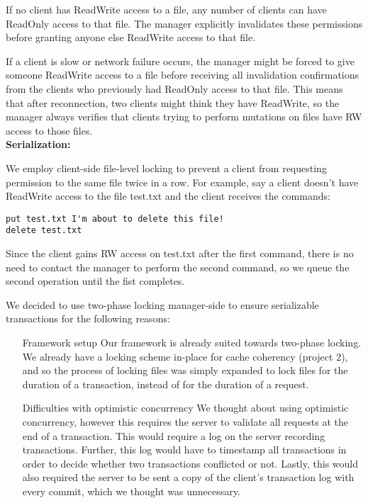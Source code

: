 \documentclass[11pt]{article}
\begin{document}
If no client has ReadWrite access to a file, any number of clients can have ReadOnly access to that file.
The manager explicitly invalidates these permissions before granting anyone else ReadWrite access to that file.

If a client is slow or network failure occurs, the manager might be forced to give someone ReadWrite access to a file before receiving all invalidation confirmations from the clients who previously had ReadOnly access to that file. This means that after reconnection, two clients might think they have ReadWrite, so the manager always verifies that clients trying to perform mutations on files have RW access to those files. \\

\textbf{Serialization:}

We employ client-side file-level locking to prevent a client from requesting permission to the same file twice in a row.
For example, say a client doesn't have ReadWrite access to the file test.txt and the client receives the commands:

\begin{verbatim}
put test.txt I'm about to delete this file!
delete test.txt
\end{verbatim}

Since the client gains RW access on test.txt after the first command, there is no need to contact the manager to perform the second command, so we queue the second operation until the fist completes.

We decided to use two-phase locking manager-side to ensure serializable transactions for the following reasons:

\begin{enumerate}
\item[Framework setup] Our framework is already suited towards two-phase locking. We already have a locking scheme in-place for cache coherency (project 2), and so the process of locking files was 
simply expanded to lock files for the duration of a transaction, instead of for the duration of a request.
\item[Difficulties with optimistic concurrency] We thought about using optimistic concurrency, however this requires the server to validate all requests at the end of a transaction. This would require
a log on the server recording transactions. Further, this log would have to timestamp all transactions in order to decide whether two transactions conflicted or not. Lastly, this would also required the
server to be sent a copy of the client's transaction log with every commit, which we thought was unnecessary.
\end{enumerate}
\end{document}
